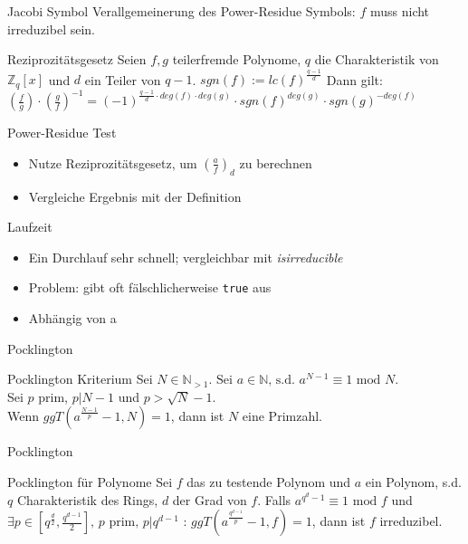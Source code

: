 \documentclass[german,10pt,xcolor=colortbl,compress]{beamer}%
\newcommand{\ZZ}{\mathbb{Z}}
\newcommand{\NN}{\mathbb{N}}
\begin{document}
	
	\begin{frame}{Jacobi Symbol}
		Verallgemeinerung des Power-Residue Symbols: $f$ muss nicht irreduzibel sein.
		
		\begin{block}{Reziprozitätsgesetz}
			Seien $f,g$ teilerfremde Polynome, $q$ die Charakteristik von $\ZZ_q[x]$ und $d$ ein Teiler von $q-1$.
			$sgn(f):=lc(f)^{\frac{q-1}{d}}$ 
			Dann gilt:
			$\left(\frac{f}{g}\right) \cdot \left(\frac{g}{f}\right)^{-1} = (-1)^{\frac{q-1}{d} \cdot deg(f)\cdot deg(g)}\cdot sgn(f)^{deg(g)} \cdot sgn(g)^{-deg(f)} $
							
		\end{block}
	\end{frame}

	
	\begin{frame}{Power-Residue Test}
		\begin{itemize}
		\item Nutze Reziprozitätsgesetz, um $(\frac{a}{f})_d $ zu berechnen
		\item Vergleiche Ergebnis mit der Definition
		\end{itemize}
	\end{frame}

	
	\begin{frame}{Laufzeit}
		\begin{itemize}
			\item Ein Durchlauf sehr schnell; vergleichbar mit \textit{isirreducible}
			\item Problem: gibt oft fälschlicherweise \texttt{true} aus
			\item Abhängig von a
		\end{itemize}
	\end{frame}

	
	\begin{frame}{Pocklington}
		\begin{block}{Pocklington Kriterium}
			Sei $N\in \NN_{>1}$. $%
			\text{Sei } a \in \NN \text{, s.d. } a^{N-1} \equiv 1 \text{ mod } N$.\\
			Sei $p$ prim, $p | N-1$ und $p> \sqrt{N}-1$.\\
			Wenn $ggT(a^{\frac{N-1}{p}}-1,N) = 1$, dann ist $N$ eine Primzahl.
		\end{block}
	\end{frame}

		
	\begin{frame}{Pocklington}
		\begin{block}{Pocklington für Polynome}
			Sei $f$ das zu testende Polynom und $a$ ein Polynom, s.d. 
			$q$ Charakteristik des Rings, $d$ der Grad von $f$.
			Falls $a^{q^{d}-1}\equiv 1 \text{ mod }f$ und 
			$\exists p \in [q^{\frac{d}{2}}, \frac{q^{d-1}}{2}]\text{, } p \text{ prim, } p|q^{d-1} $ : $ggT(a^{\frac{q^{d-1}}{p}}-1, f)=1$, dann ist $f$ irreduzibel. 
		\end{block}
	
	\end{frame}
\end{document}
